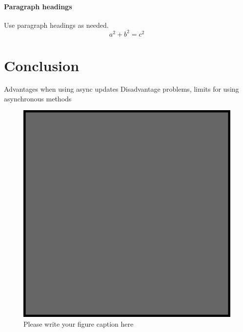     \paragraph{Paragraph headings} Use paragraph headings as needed.
    \begin{equation}
        a^2+b^2=c^2
    \end{equation}
    
    \section{Conclusion}
Advantages when using async updates
Disadvantage problems, limits for using asynchronous methods
    \begin{figure}
        \includegraphics{example.eps}
        \caption{Please write your figure caption here}
        \label{fig:1}
    \end{figure}
